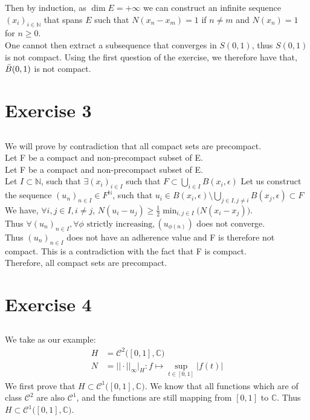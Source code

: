 \documentclass{article}
\begin{document}
\noindent Then by induction, as $\dim E = + \infty$ we can construct an infinite sequence $(x_i)_{i \in \mathbb{N}}$ that spans $E$ such that $N(x_n - x_m) = 1$ if $n \neq m$ and $N(x_n) = 1$ for $n \geq 0$.\\

\noindent One cannot then extract a subsequence that converges in $S(0,1)$, thus $S(0,1)$ is not compact. Using the first question of the exercise, we therefore have that, $\Bar{B}(0,1)$ is not compact. 


\section{Exercise 3}
\subsection{} %
We will prove by contradiction that all compact sets are precompact. \\

Let F be a compact and non-precompact subset of E.\\
\noindent Let F be a compact and non-precompact subset of E.\\
Let $I \subset \mathbb{N}$, such that $\exists (x_i)_{i \in I}$ such that $F\subset\bigcup\limits_{i\in I}B(x_i, \epsilon)$ 
Let us construct the sequence $(u_n)_{n \in I} \in F^{\mathbb{N}}$, such that $u_i \in B(x_i,\epsilon) \setminus \bigcup \limits_{j\in I, j \neq i}B(x_j, \epsilon) \subset F$ \\
We have, $\forall i,j \in I,i \neq j$, $N(u_i-u_j) \geq \frac{1}{2} \min_{i,j \in I}\big( N(x_i-x_j)\big)$.\\
Thus $\forall (u_n)_{n \in I}, \forall \phi \text{ strictly increasing}, (u_{\phi(n)})$ does not converge.\\
Thus $(u_n)_{n \in I}$ does not have an adherence value and F is therefore not compact. This is a contradiction with the fact that F is compact.\\
Therefore, all compact sets are precompact.\\


\section{Exercise 4}
\subsection{} %
We take as our example:
\begin{align*}
	H &= \mathcal{C}^2\big( [0,1] , \mathbb{C} \big)\\
	N &= ||\cdot || _{\infty} \big|_{H} : f \mapsto \sup_{t \in [0,1]} |f(t)|
\end{align*}
We first prove that $H \subset \mathcal{C}^1\big( [0,1] , \mathbb{C} \big)$. We know that all functions which are of class $\mathcal{C}^2$ are also $\mathcal{C}^1$, and the functions are still mapping from $[0,1]$ to $\mathbb{C}$. Thus $H \subset \mathcal{C}^1\big( [0,1] , \mathbb{C} \big)$.\\
\end{document}
